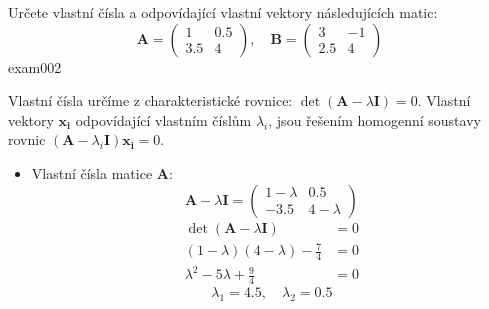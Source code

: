 \begin{mahtexam}{Určete vlastní čísla a odpovídající vlastní vektory následují\-cích matic:
  \begin{equation*}
    \mathbf{A}=
      \begin{pmatrix}
        1   & 0.5\\
        3.5 & 4
      \end{pmatrix}, \quad
    \mathbf{B}=
      \begin{pmatrix}
        3   & -1 \\
        2.5 &  4 
      \end{pmatrix}
  \end{equation*}
  }{exam002}

  Vlastní čísla určíme z charakteristické rovnice: \(\det(\mathbf{A} - \lambda\mathbf{I}) = 0\).
  Vlastní vektory \(\mathbf{x_i}\) odpovídající vlastním číslům \(\lambda_i\), jsou řešením
  homogenní soustavy rovnic \((\mathbf{A} - \lambda_i\mathbf{I})\mathbf{x_i} = 0\).
  \begin{itemize}
    \item Vlastní čísla matice \textbf{A}:
      \begin{equation*}
          \textbf{A} - \lambda\textbf{I} =
            \begin{pmatrix}
                1-\lambda  &  0.5          \\
              -3.5         &  4-\lambda
            \end{pmatrix}
      \end{equation*}
      \begin{align*}
        \det(\mathbf{A}-\lambda\mathbf{I}) &= 0 \\
        (1-\lambda)(4-\lambda)-\frac{7}{4} &= 0 \\
        \lambda^2-5\lambda+\frac{9}{4}     &= 0
      \end{align*}
      \begin{equation*}
        \lambda_1 = 4.5,\quad \lambda_2 = 0.5
      \end{equation*}
  \end{itemize}


\end{mahtexam}

